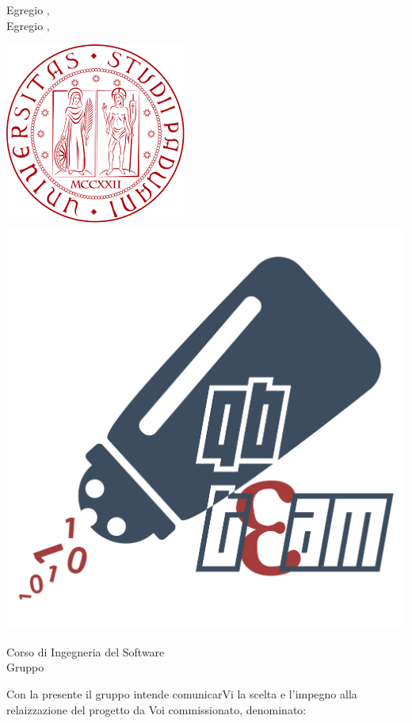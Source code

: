 \documentclass[12pt]{letter}
\begin{document}
    \begin{letter}
        { Egregio \VT{},\\Egregio \CR{},}
        \begin{center}
            \includegraphics[scale=0.5]{../Utilita/Immagini/logoUnipd.png}
            \includegraphics[scale=0.095]{../Utilita/Immagini/qbteam.png}
        \end{center}
        {
            Corso di Ingegneria del Software\\ Gruppo \Gruppo{}
        }
        \opening{ Con la presente il gruppo \Gruppo{} intende comunicarVi la scelta e l'impegno alla relaizzazione del progetto da Voi commissionato, denominato:}
        \begin{center}
            \NomeProgetto{}

\end{center}
\end{letter}
\end{document}
